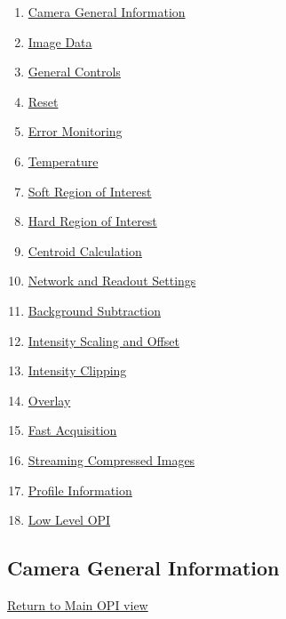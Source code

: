\documentclass[openany]{article}
\begin{document}
    \begin{enumerate}
      \item \hyperref[sec:general-info]{Camera General Information}
      \item \hyperref[sec:image-data]{Image Data}
      \item \hyperref[sec:general-controls]{General Controls}
      \item \hyperref[sec:reset]{Reset}
      \item \hyperref[sec:err-mon]{Error Monitoring}
      \item \hyperref[sec:temp]{Temperature}
      \item \hyperref[sec:soft-roi]{Soft Region of Interest}
      \item \hyperref[sec:hard-roi]{Hard Region of Interest}
      \item \hyperref[sec:centroid-calc]{Centroid Calculation}
      \item \hyperref[sec:network-and-readout]{Network and Readout Settings}
      \item \hyperref[sec:background-sub]{Background Subtraction}
      \item \hyperref[sec:scaling]{Intensity Scaling and Offset}
      \item \hyperref[sec:clipping]{Intensity Clipping}
      \item \hyperref[sec:overlay]{Overlay}
      \item \hyperref[sec:fast-acq]{Fast Acquisition}
      \item \hyperref[sec:compressed-img]{Streaming Compressed Images}
      \item \hyperref[sec:profile-info]{Profile Information}
      \item \hyperref[sec:low-level-pvs]{Low Level OPI}
    \end{enumerate}

    \subsection{Camera General Information}\label{sec:general-info}

        \hyperref[fig:opi-main]{Return to Main OPI view}
\end{document}
